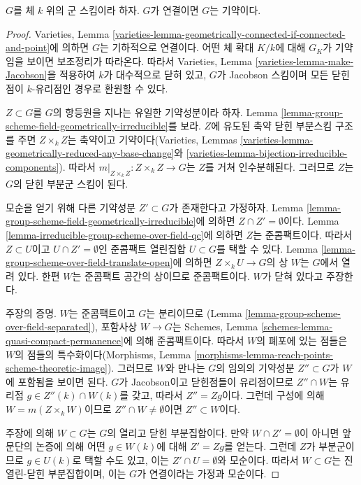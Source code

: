 \begin{lemma}
\label{lemma-connected-group-scheme-over-field-irreducible}
$G$를 체 $k$ 위의 군 스킴이라 하자. $G$가 연결이면 $G$는 기약이다.
\end{lemma}

\begin{proof}
Varieties, Lemma
\ref{varieties-lemma-geometrically-connected-if-connected-and-point}에 의하면 $G$는 기하적으로 연결이다.
어떤 체 확대 $K/k$에 대해 $G_K$가 기약임을 보이면 보조정리가 따라온다. 따라서
Varieties, Lemma \ref{varieties-lemma-make-Jacobson}을 적용하여 $k$가 대수적으로 닫혀 있고,
$G$가 Jacobson 스킴이며 모든 닫힌점이 $k$-유리점인 경우로 환원할 수 있다.

\medskip\noindent
$Z \subset G$를 $G$의 항등원을 지나는 유일한 기약성분이라 하자. Lemma
\ref{lemma-group-scheme-field-geometrically-irreducible}를 보라. $Z$에 유도된 축약 닫힌 부분스킴 구조를 주면
$Z \times_k Z$는 축약이고 기약이다(Varieties, Lemmas
\ref{varieties-lemma-geometrically-reduced-any-base-change}와
\ref{varieties-lemma-bijection-irreducible-components}). 따라서
$m|_{Z \times_k Z} : Z \times_k Z \to G$는 $Z$를 거쳐 인수분해된다. 그러므로 $Z$는 $G$의 닫힌 부분군 스킴이 된다.

\medskip\noindent
모순을 얻기 위해 다른 기약성분 $Z' \subset G$가 존재한다고 가정하자.
Lemma \ref{lemma-group-scheme-field-geometrically-irreducible}에 의하면 $Z \cap Z' = \emptyset$이다.
Lemma \ref{lemma-irreducible-group-scheme-over-field-qc}에 의하면 $Z$는 준콤팩트이다. 따라서
$Z \subset U$이고 $U \cap Z' = \emptyset$인 준콤팩트 열린집합 $U \subset G$를 택할 수 있다.
Lemma \ref{lemma-group-scheme-over-field-translate-open}에 의하면 $Z \times_k U \to G$의 상 $W$는
$G$에서 열려 있다. 한편 $W$는 준콤팩트 공간의 상이므로 준콤팩트이다.
$W$가 닫혀 있다고 주장한다.

\medskip\noindent
주장의 증명. $W$는 준콤팩트이고 $G$는 분리이므로
(Lemma \ref{lemma-group-scheme-over-field-separated}), 포함사상 $W \to G$는 Schemes, Lemma
\ref{schemes-lemma-quasi-compact-permanence}에 의해 준콤팩트이다. 따라서 $W$의 폐포에 있는 점들은
$W$의 점들의 특수화이다(Morphisms, Lemma
\ref{morphisms-lemma-reach-points-scheme-theoretic-image}). 그러므로 $W$와 만나는 $G$의 임의의 기약성분
$Z'' \subset G$가 $W$에 포함됨을 보이면 된다. $G$가 Jacobson이고 닫힌점들이 유리점이므로
$Z'' \cap W$는 유리점 $g \in Z''(k) \cap W(k)$를 갖고, 따라서 $Z'' = Zg$이다. 그런데 구성에 의해
$W = m(Z \times_k W)$이므로 $Z'' \cap W \not = \emptyset$이면 $Z'' \subset W$이다.

\medskip\noindent
주장에 의해 $W \subset G$는 $G$의 열리고 닫힌 부분집합이다. 만약 $W \cap Z' = \emptyset$이 아니면
앞 문단의 논증에 의해 어떤 $g \in W(k)$에 대해 $Z' = Zg$를 얻는다. 그런데 $Z$가 부분군이므로
$g \in U(k)$로 택할 수도 있고, 이는 $Z' \cap U = \emptyset$와 모순이다. 따라서 $W \subset G$는 진열린-닫힌 부분집합이며,
이는 $G$가 연결이라는 가정과 모순이다.
\end{proof}

